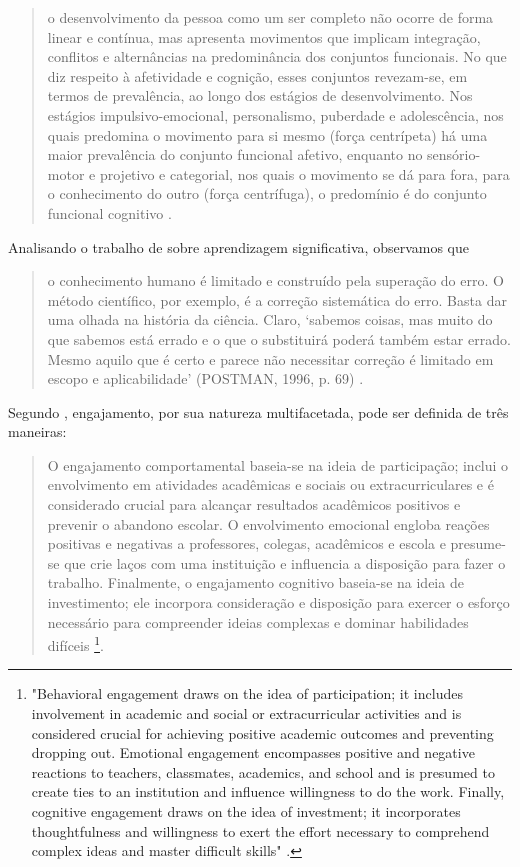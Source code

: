 \documentclass{textolivre}
\begin{document}
\begin{quote}
o desenvolvimento da pessoa como um ser completo não ocorre de forma linear e contínua, mas apresenta movimentos que implicam integração, conflitos e alternâncias na predominância dos conjuntos funcionais. No que diz respeito à afetividade e cognição, esses conjuntos revezam-se, em termos de prevalência, ao longo dos estágios de desenvolvimento. Nos estágios impulsivo-emocional, personalismo, puberdade e adolescência, nos quais predomina o movimento para si mesmo (força centrípeta) há uma maior prevalência do conjunto funcional afetivo, enquanto no sensório-motor e projetivo e categorial, nos quais o movimento se dá para fora, para o conhecimento do outro (força centrífuga), o predomínio é do conjunto funcional cognitivo \cite[p. 29]{ferreira2010}.
\end{quote}

Analisando o trabalho de \textcite{moreira2006} sobre aprendizagem significativa, observamos que

\begin{quote}
o conhecimento humano é limitado e construído pela superação do erro. O método científico, por exemplo, é a correção sistemática do erro. Basta dar uma olhada na história da ciência. Claro, ‘sabemos coisas, mas muito do que sabemos está errado e o que o substituirá poderá também estar errado. Mesmo aquilo que é certo e parece não necessitar correção é limitado em escopo e aplicabilidade’ (POSTMAN, 1996, p. 69) \cite[p. 24]{moreira2006}.
\end{quote}

Segundo \textcite{fredricks2004}, engajamento, por sua natureza multifacetada, pode ser definida de três maneiras:

\begin{quote}
O engajamento comportamental baseia-se na ideia de participação; inclui o envolvimento em atividades acadêmicas e sociais ou extracurriculares e é considerado crucial para alcançar resultados acadêmicos positivos e prevenir o abandono escolar. O envolvimento emocional engloba reações positivas e negativas a professores, colegas, acadêmicos e escola e presume-se que crie laços com uma instituição e influencia a disposição para fazer o trabalho. Finalmente, o engajamento cognitivo baseia-se na ideia de investimento; ele incorpora consideração e disposição para exercer o esforço necessário para compreender ideias complexas e dominar habilidades difíceis \cite[p. 60, tradução dos autores]{fredricks2004}\footnote{"Behavioral engagement draws on the idea of participation; it includes involvement in academic and social or extracurricular activities and is considered crucial for achieving positive academic outcomes and preventing dropping out. Emotional engagement encompasses positive and negative reactions to teachers, classmates, academics, and school and is presumed to create ties to an institution and influence willingness to do the work. Finally, cognitive engagement draws on the idea of investment; it incorporates thoughtfulness and willingness to exert the effort necessary to comprehend complex ideas and master difficult skills" \cite[p. 60]{fredricks2004}.}. 
\end{quote}
\end{document}
